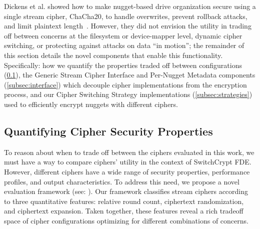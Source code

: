 Dickens et al. showed how to make nugget-based drive organization secure using a
single stream cipher, ChaCha20, to handle overwrites, prevent rollback attacks,
and limit plaintext length~\cite{StrongBox}. However, they did not envision the
utility in trading off between concerns at the filesystem or device-mapper
level, dynamic cipher switching, or protecting against attacks on data ``in
motion''; the remainder of this section details the novel components that enable
this functionality. Specifically: how we quantify the properties traded off
between configurations (\cref{subsec:quantify}), the Generic Stream Cipher
Interface and Per-Nugget Metadata components (\cref{subsec:interface}) which
decouple cipher implementations from the encryption process, and our Cipher
Switching Strategy implementations (\cref{subsec:strategies}) used to
efficiently encrypt nuggets with different ciphers.

\subsection{Quantifying Cipher Security Properties} \label{subsec:quantify}

To reason about when to trade off between the ciphers evaluated in this work, we
must have a way to compare ciphers' utility in the context of SwitchCrypt FDE.
However, different ciphers have a wide range of security properties, performance
profiles, and output characteristics. To address this need, we propose a novel
evaluation framework (see: ). Our framework classifies
stream ciphers according to three quantitative features: relative round count,
ciphertext randomization, and ciphertext expansion. Taken together, these
features reveal a rich tradeoff space of cipher configurations optimizing for
different combinations of concerns.

